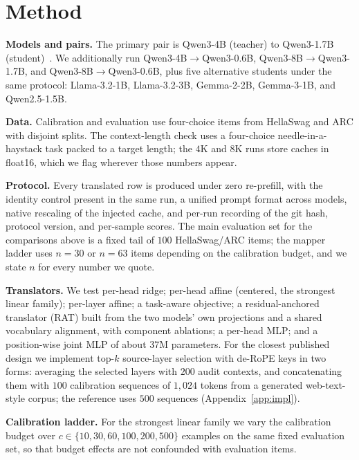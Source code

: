 \documentclass[10pt]{article}
\begin{document}

\section{Method}
\label{sec:method}

\textbf{Models and pairs.} The primary pair is Qwen3-4B (teacher) to Qwen3-1.7B
(student)~\citep{qwen3}. We additionally run Qwen3-4B$\to$Qwen3-0.6B, Qwen3-8B$\to$Qwen3-1.7B,
and Qwen3-8B$\to$Qwen3-0.6B, plus five alternative students under the same
protocol: Llama-3.2-1B, Llama-3.2-3B, Gemma-2-2B, Gemma-3-1B, and Qwen2.5-1.5B.

\textbf{Data.} Calibration and evaluation use four-choice items from HellaSwag
and ARC with disjoint splits. The context-length check uses a four-choice
needle-in-a-haystack task packed to a target length; the $4$K and $8$K runs
store caches in float16, which we flag wherever those numbers appear.

\textbf{Protocol.} Every translated row is produced under zero re-prefill, with
the identity control present in the same run, a unified prompt format across
models, native rescaling of the injected cache, and per-run recording of the git
hash, protocol version, and per-sample scores. The main evaluation set for the
comparisons above is a fixed tail of $100$ HellaSwag/ARC items; the mapper ladder
uses $n=30$ or $n=63$ items depending on the calibration budget, and we state $n$
for every number we quote.

\textbf{Translators.} We test per-head ridge; per-head affine (centered, the
strongest linear family); per-layer affine; a task-aware objective; a
residual-anchored translator (RAT) built from the two
models' own projections and a shared vocabulary alignment, with component
ablations; a per-head MLP; and a position-wise joint MLP of about $37$M
parameters. For the closest published design we implement top-$k$ source-layer
selection with de-RoPE keys \citep{heo2026} in two forms: averaging the selected
layers with $200$ audit contexts, and concatenating them with $100$ calibration
sequences of $1{,}024$ tokens from a generated web-text-style corpus; the
reference uses $500$ sequences (Appendix~\ref{app:impl}).

\textbf{Calibration ladder.} For the strongest linear family we vary the
calibration budget over $c\in\{10,30,60,100,200,500\}$ examples on the same
fixed evaluation set, so that budget effects are not confounded with evaluation
items.
\end{document}
